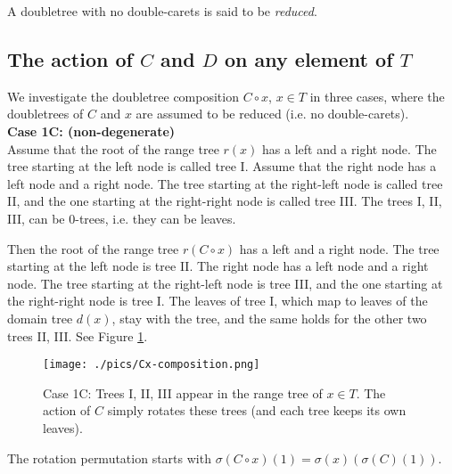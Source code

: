 \documentclass{amsart}
\theoremstyle{definition}
\begin{document}
A doubletree with no double-carets is said to be \emph{reduced}. 
\subsection{The action of $C$ and $D$ on any element of $T$}
We investigate the doubletree composition $C\circ x$, $x\in T$ in three cases, where the doubletrees of $C$ and $x$ are assumed to be reduced (i.e. no double-carets).\\
\textbf{Case 1C: (non-degenerate)}\\
Assume that the root of the range tree $r(x)$ has a left and a right node. The tree starting at the left node is called tree I. Assume that the right node has a left node and a right node. The tree starting at the right-left node is called tree II, and the one starting at the right-right node is called tree III. The trees I, II, III, can be 0-trees, i.e. they can be leaves.

Then the root of the range tree $r(C\circ x)$ has a left and a right node. The tree starting at the left node is tree II. The right node has a left node and a right node. The tree starting at the right-left node is tree III, and the one starting at the right-right node is tree I.  The leaves of tree I, which map to leaves of the domain tree $d(x)$, stay with the tree, and the same holds for the other two trees II, III. See Figure \ref{f:case1C}.
\begin{figure}
\texttt{[image: ./pics/Cx-composition.png]}\\
  \caption{Case 1C: Trees I, II, III appear in the range tree of $x\in T$.
  The action of $C$ simply rotates these trees (and each tree keeps its own leaves). 
  }\label{f:case1C}
\end{figure}
The rotation permutation starts with $\sigma(C\circ x)(1)=\sigma(x)(\sigma(C)(1))$.
\end{document}
